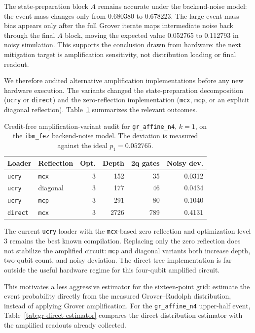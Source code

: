 The state-preparation block \(A\) remains accurate under the backend-noise
model: the event mass changes only from 0.680380 to 0.678223. The large
event-mass bias appears only after the full Grover iterate maps intermediate
noise back through the final \(A\) block, moving the expected value 0.052765 to
0.112793 in noisy simulation. This supports the conclusion drawn from hardware:
the next mitigation target is amplification sensitivity, not distribution
loading or final readout.

We therefore audited alternative amplification implementations before any new
hardware execution. The variants changed the state-preparation decomposition
(\texttt{ucry} or \texttt{direct}) and the zero-reflection implementation
(\texttt{mcx}, \texttt{mcp}, or an explicit diagonal reflection).
Table~\ref{tab:gr-affine-variant-audit} summarizes the relevant outcomes.

\begin{table}[h]
\centering
\begin{tabular}{llrrrr}
\toprule
Loader & Reflection & Opt. & Depth & 2q gates & Noisy dev. \\
\midrule
\texttt{ucry} & \texttt{mcx} & 3 & 152 & 35 & 0.0312 \\
\texttt{ucry} & diagonal & 3 & 177 & 46 & 0.0434 \\
\texttt{ucry} & \texttt{mcp} & 3 & 291 & 80 & 0.1040 \\
\texttt{direct} & \texttt{mcx} & 3 & 2726 & 789 & 0.4131 \\
\bottomrule
\end{tabular}
\caption{Credit-free amplification-variant audit for
\texttt{gr\_affine\_n4}, \(k=1\), on the \texttt{ibm\_fez} backend-noise
model. The deviation is measured against the ideal \(p_1=0.052765\).}
\label{tab:gr-affine-variant-audit}
\end{table}

The current \texttt{ucry} loader with the \texttt{mcx}-based zero reflection and
optimization level 3 remains the best known compilation. Replacing only the
zero reflection does not stabilize the amplified circuit: \texttt{mcp} and
diagonal variants both increase depth, two-qubit count, and noisy deviation.
The direct tree implementation is far outside the useful hardware regime for
this four-qubit amplified circuit.

This motivates a less aggressive estimator for the sixteen-point grid: estimate
the event probability directly from the measured Grover--Rudolph distribution,
instead of applying Grover amplification. For the \texttt{gr\_affine\_n4}
upper-half event, Table~\ref{tab:gr-direct-estimator} compares the direct
distribution estimator with the amplified readouts already collected.

